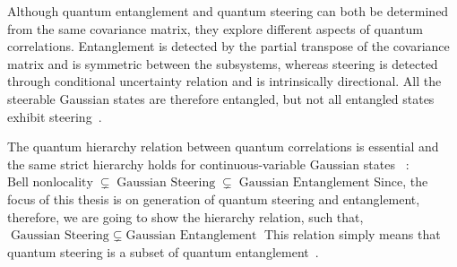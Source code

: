 Although quantum entanglement and quantum steering can both be determined from the same
covariance matrix, they explore different aspects of quantum correlations.
Entanglement is detected by the partial transpose of the covariance
matrix and is symmetric between the subsystems, whereas steering is detected
through conditional uncertainty relation and is intrinsically directional.
All the steerable Gaussian states are therefore entangled, but not all entangled
states exhibit steering~\cite{Uola2020,WisemanJonesDoherty2007}.

The quantum hierarchy relation between quantum correlations is  essential and the same strict hierarchy holds
for continuous-variable Gaussian states ~\cite{WisemanJonesDoherty2007}:
$\text{Bell nonlocality} \;\subsetneq\; \text{Gaussian Steering} \;\subsetneq\; \text{Gaussian Entanglement}$
Since, the focus of this thesis is on generation of quantum steering and entanglement, therefore, we are going to show the hierarchy relation, such that,
$\text{Gaussian Steering} \;\subsetneq\; \text{Gaussian Entanglement}$
This relation simply means that quantum steering is a subset of quantum entanglement~\cite{Uola2020}.




